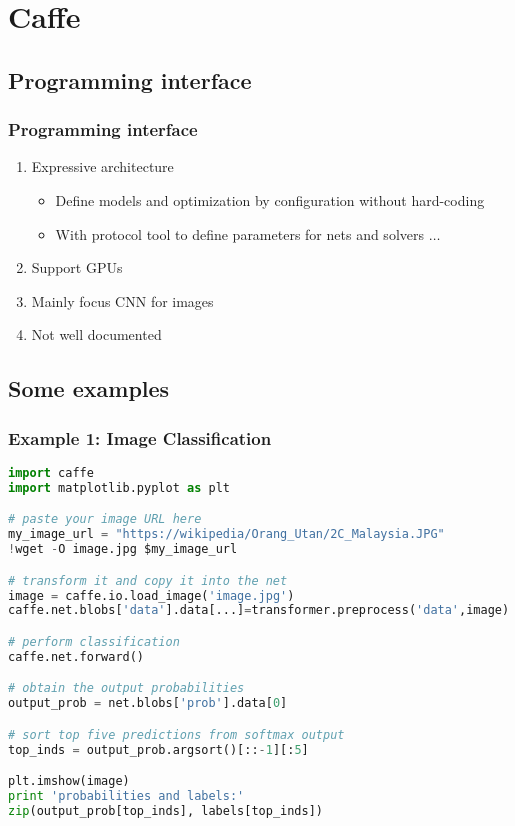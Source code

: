 
\section{Caffe}\label{sec:Caffe}

\subsection{Programming interface}

\begin{frame}
  \MyLogo
  \frametitle{Programming interface}  

\begin{enumerate}
\item Expressive architecture 
\begin{itemize}
\item Define models and optimization by configuration without hard-coding
\item With protocol tool to define parameters for nets and solvers $\ldots$
\end{itemize}
\item Support GPUs 
\item Mainly focus CNN for images
\item Not well documented
\end{enumerate}
\end{frame}

\subsection{Some examples}
\begin{frame}[fragile]
  \MyLogo
  \frametitle{Example 1: Image Classification}  
\begin{tiny}
\begin{lstlisting}[language=python]
import caffe
import matplotlib.pyplot as plt

# paste your image URL here
my_image_url = "https://wikipedia/Orang_Utan/2C_Malaysia.JPG"
!wget -O image.jpg $my_image_url

# transform it and copy it into the net
image = caffe.io.load_image('image.jpg')
caffe.net.blobs['data'].data[...]=transformer.preprocess('data',image)

# perform classification
caffe.net.forward()

# obtain the output probabilities
output_prob = net.blobs['prob'].data[0]

# sort top five predictions from softmax output
top_inds = output_prob.argsort()[::-1][:5]

plt.imshow(image)
print 'probabilities and labels:'
zip(output_prob[top_inds], labels[top_inds])\end{lstlisting}
\end{tiny}
\end{frame}



